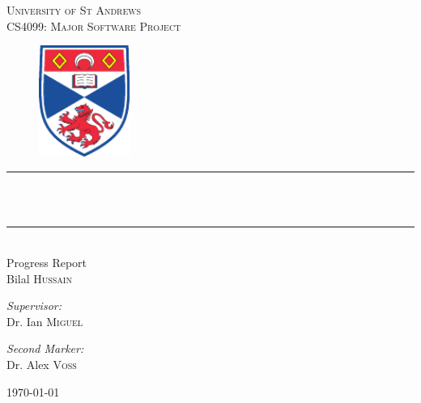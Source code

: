 
\begin{titlepage}
\thispagestyle{empty}
\begin{center}


\textsc{\LARGE University of St Andrews}\\[10pt]
\textsc{\large CS4099: Major Software Project}\\[1cm]

\begin{figure}[htbp]
	\centering
		\includegraphics[width=3cm]{settings/logo.pdf}
	\label{fig:settings_logo}
\end{figure}


\newcommand{\HRule}{\rule{9cm}{0.5mm}}

\HRule\\[10pt]
{ \Huge \bfseries \theTitle }\\
\HRule\\[20pt]
{ {\large Progress Report} \vspace{0.5cm}\\ \LARGE Bilal \textsc{Hussain}}
\vspace{1.5cm}

\begin{minipage}{0.4\textwidth}
\begin{flushleft} \large
\emph{Supervisor:} \\
Dr. Ian  \textsc{Miguel}
\end{flushleft}
\end{minipage}
\begin{minipage}{0.4\textwidth}
\begin{flushright} \large
\emph{Second Marker:} \\
Dr. Alex \textsc{Voss}
\end{flushright}
\end{minipage}

\vfill

{\large \today}
\end{center}
\end{titlepage}